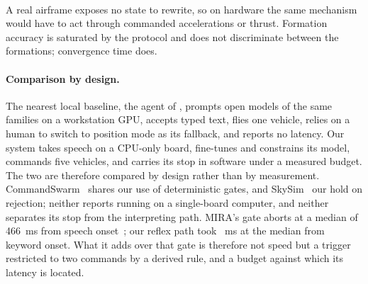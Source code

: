 \documentclass[a4paper,fleqn]{cas-dc}
\begin{document}
\paragraph{}  A real
airframe exposes no state to rewrite, so on hardware the same mechanism would have to act through
commanded accelerations or thrust. Formation accuracy is saturated by the protocol and does not
discriminate between the formations; convergence time does.

\paragraph{Comparison by design.} The nearest local baseline, the agent of \citet{lim2025}, prompts
open models of the same families on a workstation GPU, accepts typed text, flies one vehicle,
relies on a human to switch to position mode as its fallback, and reports no latency. Our system takes
speech on a CPU-only board, fine-tunes and constrains its model, commands five vehicles, and carries
its stop in software under a measured budget. The two are therefore compared by design rather than by
measurement. CommandSwarm~\citep{commandswarm2026} shares our use of deterministic gates, and
SkySim~\citep{skysim2026} our hold on rejection; neither reports running on a single-board computer,
and neither separates its stop from the interpreting path. MIRA's gate aborts at a median of 466~ms from speech onset~\citep{mira}; our reflex path took ~ms at the median from keyword onset. What it adds over that gate is therefore not speed but a trigger restricted to two commands by a derived rule, and a budget against which its latency is located.
\end{document}
